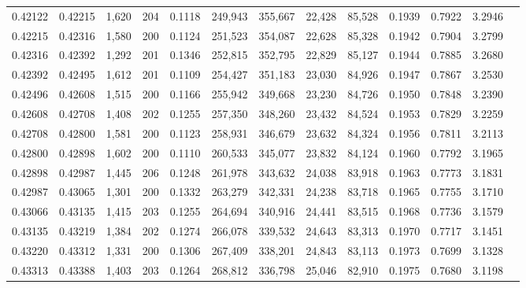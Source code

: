 \begin{tabular}{rrrrrrrrrrrrr}
0.42122 & 0.42215 & 1,620 & 204 &                                     0.1118 & 249,943 & 355,667 &  22,428 &  85,528 & 0.1939 & 0.7922 & 3.2946 \\
0.42215 & 0.42316 & 1,580 & 200 &                                     0.1124 & 251,523 & 354,087 &  22,628 &  85,328 & 0.1942 & 0.7904 & 3.2799 \\
0.42316 & 0.42392 & 1,292 & 201 &                                     0.1346 & 252,815 & 352,795 &  22,829 &  85,127 & 0.1944 & 0.7885 & 3.2680 \\
0.42392 & 0.42495 & 1,612 & 201 &                                     0.1109 & 254,427 & 351,183 &  23,030 &  84,926 & 0.1947 & 0.7867 & 3.2530 \\
0.42496 & 0.42608 & 1,515 & 200 &                                     0.1166 & 255,942 & 349,668 &  23,230 &  84,726 & 0.1950 & 0.7848 & 3.2390 \\
0.42608 & 0.42708 & 1,408 & 202 &                                     0.1255 & 257,350 & 348,260 &  23,432 &  84,524 & 0.1953 & 0.7829 & 3.2259 \\
0.42708 & 0.42800 & 1,581 & 200 &                                     0.1123 & 258,931 & 346,679 &  23,632 &  84,324 & 0.1956 & 0.7811 & 3.2113 \\
0.42800 & 0.42898 & 1,602 & 200 &                                     0.1110 & 260,533 & 345,077 &  23,832 &  84,124 & 0.1960 & 0.7792 & 3.1965 \\
0.42898 & 0.42987 & 1,445 & 206 &                                     0.1248 & 261,978 & 343,632 &  24,038 &  83,918 & 0.1963 & 0.7773 & 3.1831 \\
0.42987 & 0.43065 & 1,301 & 200 &                                     0.1332 & 263,279 & 342,331 &  24,238 &  83,718 & 0.1965 & 0.7755 & 3.1710 \\
0.43066 & 0.43135 & 1,415 & 203 &                                     0.1255 & 264,694 & 340,916 &  24,441 &  83,515 & 0.1968 & 0.7736 & 3.1579 \\
0.43135 & 0.43219 & 1,384 & 202 &                                     0.1274 & 266,078 & 339,532 &  24,643 &  83,313 & 0.1970 & 0.7717 & 3.1451 \\
0.43220 & 0.43312 & 1,331 & 200 &                                     0.1306 & 267,409 & 338,201 &  24,843 &  83,113 & 0.1973 & 0.7699 & 3.1328 \\
0.43313 & 0.43388 & 1,403 & 203 &                                     0.1264 & 268,812 & 336,798 &  25,046 &  82,910 & 0.1975 & 0.7680 & 3.1198 \\

\end{tabular}

